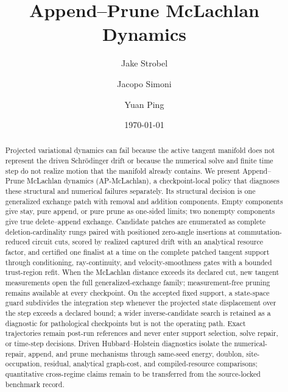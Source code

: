 \documentclass[
  reprint,
  amsmath,
  amssymb,
  aps,
  pra,
  nofootinbib,
  superscriptaddress,
  floatfix
]{revtex4-2}
\newcommand{\tentative}[1]{\textcolor{red!70!black}{#1}}
\begin{document}
\title{Append--Prune McLachlan Dynamics}

\author{Jake Strobel}
\author{Jacopo Simoni}
\author{Yuan Ping}

\date{\today}


\begin{abstract}
Projected variational dynamics can fail because the active tangent manifold does not represent the driven Schr\"odinger drift or because the numerical solve and finite time step do not realize motion that the manifold already contains.  We present Append--Prune McLachlan dynamics (AP-McLachlan), a checkpoint-local policy that diagnoses these structural and numerical failures separately.  Its structural decision is one generalized exchange patch with removal and addition components.  Empty components give stay, pure append, or pure prune as one-sided limits; two nonempty components give true delete--append exchange.  Candidate patches are enumerated as complete deletion-cardinality rungs paired with positioned zero-angle insertions at commutation-reduced circuit cuts, scored by realized captured drift with an analytical resource factor, and certified one finalist at a time on the complete patched tangent support through conditioning, ray-continuity, and velocity-smoothness gates with a bounded trust-region refit.  When the McLachlan distance exceeds its declared cut, new tangent measurements open the full generalized-exchange family; measurement-free pruning remains available at every checkpoint.  On the accepted fixed support, a state-space guard subdivides the integration step whenever the projected state displacement over the step exceeds a declared bound; a wider inverse-candidate search is retained as a diagnostic for pathological checkpoints but is not the operating path.  Exact trajectories remain post-run references and never enter support selection, solve repair, or time-step decisions.  Driven Hubbard--Holstein diagnostics isolate the numerical-repair, append, and prune mechanisms through same-seed energy, doublon, site-occupation, residual, analytical graph-cost, and compiled-resource comparisons; quantitative cross-regime claims remain \tentative{to be transferred from the source-locked benchmark record}.
\end{abstract}

\maketitle
\end{document}
